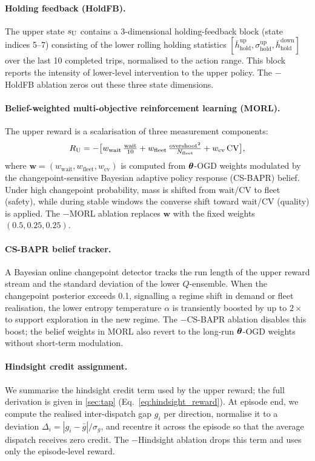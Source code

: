 \paragraph{Holding feedback (HoldFB).}
The upper state $s_{\mathrm{U}}$ contains a 3-dimensional holding-feedback block (state indices 5--7) consisting of the lower rolling holding statistics $[\bar{h}_{\text{hold}}^{\text{up}}, \sigma_{\text{hold}}^{\text{up}}, \bar{h}_{\text{hold}}^{\text{down}}]$ over the last 10 completed trips, normalised to the action range. This block reports the intensity of lower-level intervention to the upper policy. The $-$HoldFB ablation zeros out these three state dimensions.

\paragraph{Belief-weighted multi-objective reinforcement learning (MORL).}
The upper reward is a scalarisation of three measurement components:
\begin{equation}
\label{eq:morl_reward}
    R_{\mathrm{U}} = -\bigl[w_{\mathrm{wait}}\,\tfrac{\text{wait}}{10} + w_{\mathrm{fleet}}\,\tfrac{\mathrm{overshoot}^2}{N_{\mathrm{fleet}}} + w_{\mathrm{cv}}\,\mathrm{CV}\bigr],
\end{equation}
where $\boldsymbol{w} = (w_{\mathrm{wait}}, w_{\mathrm{fleet}}, w_{\mathrm{cv}})$ is computed from $\boldsymbol{\theta}$-OGD weights modulated by the changepoint-sensitive Bayesian adaptive policy response (CS-BAPR) belief. Under high changepoint probability, mass is shifted from wait/CV to fleet (safety), while during stable windows the converse shift toward wait/CV (quality) is applied. The $-$MORL ablation replaces $\boldsymbol{w}$ with the fixed weights $(0.5, 0.25, 0.25)$.

\paragraph{CS-BAPR belief tracker.}
A Bayesian online changepoint detector tracks the run length of the upper reward stream and the standard deviation of the lower $Q$-ensemble. When the changepoint posterior exceeds 0.1, signalling a regime shift in demand or fleet realisation, the lower entropy temperature $\alpha$ is transiently boosted by up to $2\times$ to support exploration in the new regime. The $-$CS-BAPR ablation disables this boost; the belief weights in MORL also revert to the long-run $\boldsymbol{\theta}$-OGD weights without short-term modulation.

\paragraph{Hindsight credit assignment.}
We summarise the hindsight credit term used by the upper reward; the full derivation is given in \cref{sec:tap} (Eq.~\ref{eq:hindsight_reward}). At episode end, we compute the realised inter-dispatch gap $g_i$ per direction, normalise it to a deviation $\Delta_i = |g_i - \bar{g}|/\sigma_g$, and recentre it across the episode so that the average dispatch receives zero credit. The $-$Hindsight ablation drops this term and uses only the episode-level reward.

